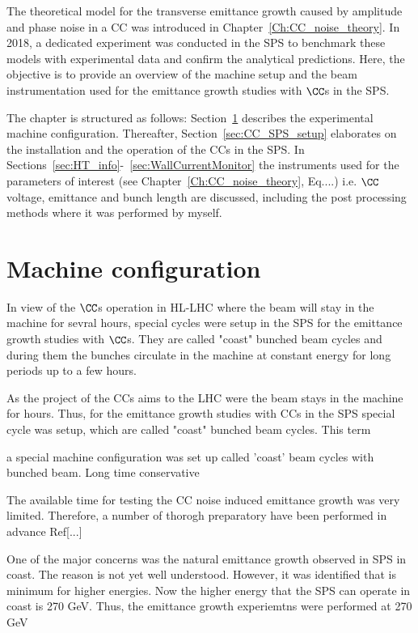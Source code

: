 \vspace*{-1mm}
The theoretical model for the transverse emittance growth caused by amplitude and phase noise in a CC was introduced in Chapter~\ref{Ch:CC_noise_theory}. In 2018, a dedicated experiment was conducted in the SPS to benchmark these models with experimental data and confirm the analytical predictions. Here, the objective is to provide an overview of the machine setup and the beam instrumentation used for the emittance growth studies with $\CC$s in the SPS.

The chapter is structured as follows: Section~\ref{sec:SPS_setup} describes the experimental machine configuration. Thereafter, Section~\ref{sec:CC_SPS_setup} elaborates on the installation and the operation of the CCs in the SPS. In Sections~\ref{sec:HT_info}-~\ref{sec:WallCurrentMonitor} the instruments used for the parameters of interest (see Chapter~\ref{Ch:CC_noise_theory}, Eq....) i.e. $\CC$ voltage, emittance and bunch length are discussed, including the post processing methods where it was performed by myself.

\section{Machine configuration}\label{sec:SPS_setup}
In view of the $\CC$s operation in HL-LHC where the beam will stay in the machine for sevral hours, special cycles were setup in the SPS for the emittance growth studies with $\CC$s. They are called "coast" bunched beam cycles and during them the bunches circulate in the machine at constant energy for long periods up to a few hours.

As the project of the CCs aims to the LHC were the beam stays in the machine for hours. Thus, for the emittance growth studies with CCs in the SPS special cycle was setup, which are called "coast" bunched beam cycles. This term 


a special machine configuration was set up called 'coast' beam cycles with bunched beam. 
Long time conservative


The available time for testing the CC noise induced emittance growth was very limited. Therefore, a number of thorogh preparatory have been performed in advance Ref[...]

One of the major concerns was the natural emittance growth observed in SPS in coast. The reason is not yet well understood. However, it was identified that is minimum for higher energies. Now the higher energy that the SPS can operate in coast is 270 GeV. Thus, the emittance growth experiemtns were performed at 270 GeV




